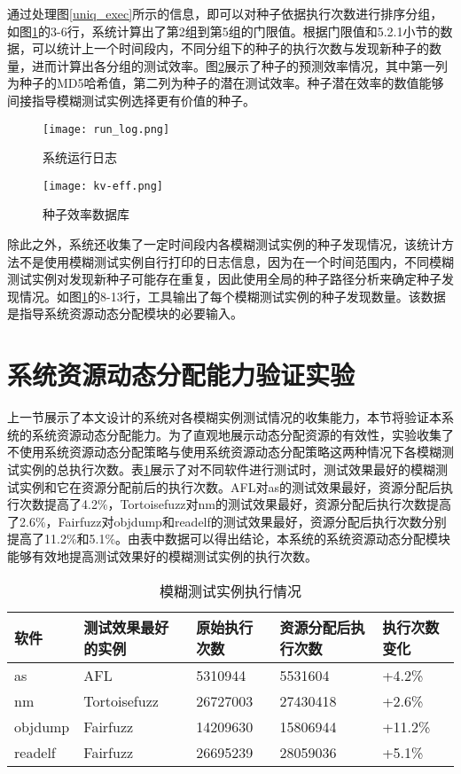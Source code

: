 \documentclass[master]{thesis-uestc}
\begin{document}
通过处理图\ref{uniq_exec}所示的信息，即可以对种子依据执行次数进行排序分组，如图\ref{run_log}的3-6行，系统计算出了第2组到第5组的门限值。根据门限值和5.2.1小节的数据，可以统计上一个时间段内，不同分组下的种子的执行次数与发现新种子的数量，进而计算出各分组的测试效率。图\ref{kv}展示了种子的预测效率情况，其中第一列为种子的MD5哈希值，第二列为种子的潜在测试效率。种子潜在效率的数值能够间接指导模糊测试实例选择更有价值的种子。

\begin{figure}[!htbp]
    \vspace{6pt}
    \centering
    \texttt{[image: run\_log.png]}
    \caption{系统运行日志}
    \label{run_log}
\end{figure}

\begin{figure}[!htbp]
    \vspace{6pt}
    \centering
    \texttt{[image: kv-eff.png]}
    \caption{种子效率数据库}
    \label{kv}
\end{figure}

除此之外，系统还收集了一定时间段内各模糊测试实例的种子发现情况，该统计方法不是使用模糊测试实例自行打印的日志信息，因为在一个时间范围内，不同模糊测试实例对发现新种子可能存在重复，因此使用全局的种子路径分析来确定种子发现情况。如图\ref{run_log}的8-13行，工具输出了每个模糊测试实例的种子发现数量。该数据是指导系统资源动态分配模块的必要输入。

\section{系统资源动态分配能力验证实验}

上一节展示了本文设计的系统对各模糊实例测试情况的收集能力，本节将验证本系统的系统资源动态分配能力。为了直观地展示动态分配资源的有效性，实验收集了不使用系统资源动态分配策略与使用系统资源动态分配策略这两种情况下各模糊测试实例的总执行次数。表\ref{table_alloc}展示了对不同软件进行测试时，测试效果最好的模糊测试实例和它在资源分配前后的执行次数。AFL对as的测试效果最好，资源分配后执行次数提高了4.2\%，Tortoisefuzz对nm的测试效果最好，资源分配后执行次数提高了2.6\%，Fairfuzz对objdump和readelf的测试效果最好，资源分配后执行次数分别提高了11.2\%和5.1\%。由表中数据可以得出结论，本系统的系统资源动态分配模块能够有效地提高测试效果好的模糊测试实例的执行次数。

\begin{table}[!htbp]
    \caption{模糊测试实例执行情况}
    \begin{tabular}{lllll}
    \toprule
    软件 & 测试效果最好的实例 & 原始执行次数 & 资源分配后执行次数 & 执行次数变化 \\
    \midrule
    as & AFL & 5310944 & 5531604 & +4.2\% \\
    nm & Tortoisefuzz & 26727003 & 27430418 & +2.6\% \\
    objdump & Fairfuzz & 14209630 & 15806944 & +11.2\% \\
    readelf & Fairfuzz & 26695239 & 28059036 & +5.1\% \\
    \bottomrule
    \end{tabular}
    \label{table_alloc}
    \vspace{6pt}
\end{table}
\end{document}
